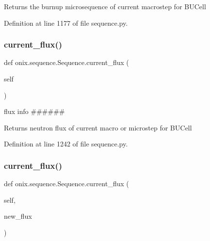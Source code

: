 \begin{DoxyVerb}Returns the burnup microsequence of current macrostep
for BUCell\end{DoxyVerb}
 

Definition at line 1177 of file sequence.\+py.

\mbox{\label{classonix_1_1sequence_1_1Sequence_aab433adc6fcbeb9147dead2512d435a1}} 
\subsubsection{\texorpdfstring{current\+\_\+flux()}{current\_flux()}\hspace{0.1cm}{\footnotesize\ttfamily [1/2]}}
{\footnotesize\ttfamily def onix.\+sequence.\+Sequence.\+current\+\_\+flux (\begin{DoxyParamCaption}\item[{}]{self }\end{DoxyParamCaption})}



flux info \#\#\#\#\#\# 

\begin{DoxyVerb}Returns neutron flux of current macro or microstep
for BUCell\end{DoxyVerb}
 

Definition at line 1242 of file sequence.\+py.

\mbox{\label{classonix_1_1sequence_1_1Sequence_a28dc898856ce65054f85f4f7fea580d4}} 
\subsubsection{\texorpdfstring{current\+\_\+flux()}{current\_flux()}\hspace{0.1cm}{\footnotesize\ttfamily [2/2]}}
{\footnotesize\ttfamily def onix.\+sequence.\+Sequence.\+current\+\_\+flux (\begin{DoxyParamCaption}\item[{}]{self,  }\item[{}]{new\+\_\+flux }\end{DoxyParamCaption})}

